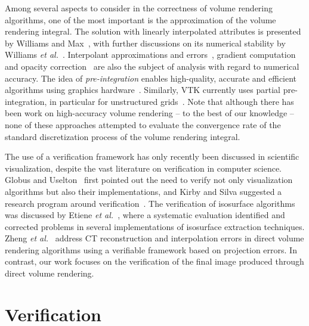 Among several aspects to consider in the correctness of volume
rendering algorithms, one of the most important is the approximation
of the volume rendering integral. The solution with linearly
interpolated attributes is presented by Williams and
Max~\cite{Williams1992}, with further discussions on its numerical
stability by Williams \emph{et al.}~\cite{Williams1998}.  Interpolant
approximations and
errors~\cite{Hajjar08,Moller:1996:CLE:236226.236235,Moller1997,Novins:1992:CPV:147130.147154},
gradient computation~\cite{Alim2010} and opacity
correction~\cite{Lee2007} are also the subject of analysis with regard
to numerical accuracy. The idea of \emph{pre-integration} enables
high-quality, accurate and efficient algorithms using graphics
hardware~\cite{Engel01,Kye:2008p871,Rottger2000}. Similarly, VTK
currently uses partial pre-integration, in particular for unstructured
grids~\cite{Moreland2004}. Note that although there has been work on
high-accuracy volume rendering -- to the best of our
knowledge -- none of these approaches attempted to evaluate the convergence
rate of the standard discretization process of the volume rendering integral. 

The use of a verification framework has only recently been discussed
in scientific visualization, despite the vast literature on
verification in computer science. Globus and Uselton~\cite{globus95}
first pointed out the need to verify not only visualization algorithms
but also their implementations, and Kirby and Silva suggested a
research program around verification~\cite{kirby-vv-08}. The
verification of isosurface algorithms was discussed by Etiene \emph{et
al.}~\cite{Etiene:2012:TVI:2197070.2197097, etiene:tvcg:2009}, where a systematic evaluation identified and
corrected problems in several implementations of isosurface extraction
techniques.  Zheng \emph{et al.}~\cite{Zheng10} address CT reconstruction and
interpolation errors in direct volume rendering algorithms using a
verifiable framework based on projection errors. In contrast, our work
focuses on the verification of the final image produced through direct
volume rendering.

\section{Verification}
\label{sec:verification}

